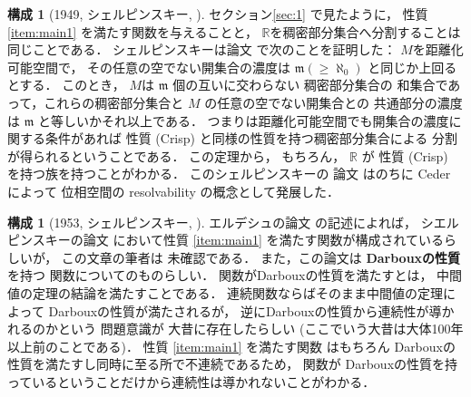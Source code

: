 \documentclass[leqno, a4paper, 12pt]{jsarticle}
\theoremstyle{definition}
\newtheorem{con}[thm]{構成}
\newcommand{\rr}{\mathbb{R}}
\newcommand{\mysei}{\textup{(Crisp)}}
\begin{document}
\begin{con}[1949, シェルピンスキー, 
\cite{MR0031222}]\label{con:sie0}
セクション\ref{sec:1}
で見たように，
性質
\ref{item:main1}
を満たす関数を与えることと，
$\rr$を稠密部分集合へ分割することは同じことである．
シェルピンスキーは論文
\cite{MR0031222}
で次のことを証明した：
$M$を距離化可能空間で，
その任意の空でない開集合の濃度は
$\mathfrak{m}(\ge \aleph_{0})$
と同じか上回るとする．
このとき，
$M$は
$\mathfrak{m}$
個の互いに交わらない
稠密部分集合の
和集合であって，これらの稠密部分集合と
$M$
の任意の空でない開集合との
共通部分の濃度は
$\mathfrak{m}$
と等しいかそれ以上である．
つまりは距離化可能空間でも開集合の濃度に関する条件があれば
性質
\mysei
と同様の性質を持つ稠密部分集合による
分割が得られるということである．
この定理から，
もちろん，
$\rr$
が
性質
\mysei
を持つ族を持つことがわかる．
このシェルピンスキーの
論文
\cite{MR0031222}
はのちに
Ceder
\cite{MR0163279}
によって
位相空間の
resolvability
の概念として発展した．
\end{con}

\begin{con}[1953, シェルピンスキー, \cite{MR0064126}]\label{con:sie}
エルデシュの論文
\cite{MR0197631}
の記述によれば，
シエルピンスキーの論文
\cite{MR0064126}
において性質
\ref{item:main1}
を満たす関数が構成されているらしいが，
この文章の筆者は
未確認である．
また，この論文は
\textbf{Darbouxの性質}
を持つ
関数についてのものらしい．
関数がDarbouxの性質を満たすとは，
中間値の定理の結論を満たすことである．
連続関数ならばそのまま中間値の定理によって
Darbouxの性質が満たされるが，
逆にDarbouxの性質から連続性が導かれるのかという
問題意識が
大昔に存在したらしい
(ここでいう大昔は大体100年以上前のことである)．
性質
\ref{item:main1}
を満たす関数
はもちろん
Darbouxの性質を満たすし同時に至る所で不連続であるため，
関数が
Darbouxの性質を持っているということだけから連続性は導かれないことがわかる．
\end{con}
\end{document}
